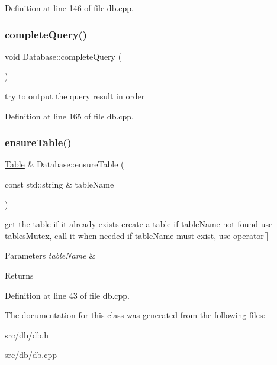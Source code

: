 Definition at line 146 of file db.\+cpp.

\mbox{\label{class_database_a55858cf28c9a4118ac97bdc9a1abf981}} 
\subsubsection{\texorpdfstring{complete\+Query()}{completeQuery()}}
{\footnotesize\ttfamily void Database\+::complete\+Query (\begin{DoxyParamCaption}{ }\end{DoxyParamCaption})}

try to output the query result in order 

Definition at line 165 of file db.\+cpp.

\mbox{\label{class_database_a1405a11517ac20b0036514120782cee5}} 
\subsubsection{\texorpdfstring{ensure\+Table()}{ensureTable()}}
{\footnotesize\ttfamily \hyperlink{class_table}{Table} \& Database\+::ensure\+Table (\begin{DoxyParamCaption}\item[{const std\+::string \&}]{table\+Name }\end{DoxyParamCaption})}

get the table if it already exists create a table if table\+Name not found use tables\+Mutex, call it when needed if table\+Name must exist, use operator\mbox{[}\mbox{]} 
\begin{DoxyParams}{Parameters}
{\em table\+Name} & \\
\hline
\end{DoxyParams}
\begin{DoxyReturn}{Returns}

\end{DoxyReturn}


Definition at line 43 of file db.\+cpp.



The documentation for this class was generated from the following files\+:\begin{DoxyCompactItemize}
\item 
src/db/db.\+h\item 
src/db/db.\+cpp\end{DoxyCompactItemize}
